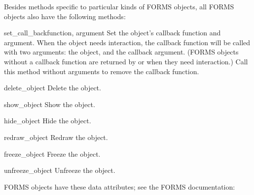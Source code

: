 Besides methods specific to particular kinds of FORMS objects, all
FORMS objects also have the following methods:

\begin{methoddesc}{set_call_back}{function, argument}
Set the object's callback function and argument.  When the object
needs interaction, the callback function will be called with two
arguments: the object, and the callback argument.  (FORMS objects
without a callback function are returned by 
or  when they need interaction.)  Call this
method without arguments to remove the callback function.
\end{methoddesc}

\begin{methoddesc}{delete_object}{}
  Delete the object.
\end{methoddesc}

\begin{methoddesc}{show_object}{}
  Show the object.
\end{methoddesc}

\begin{methoddesc}{hide_object}{}
  Hide the object.
\end{methoddesc}

\begin{methoddesc}{redraw_object}{}
  Redraw the object.
\end{methoddesc}

\begin{methoddesc}{freeze_object}{}
  Freeze the object.
\end{methoddesc}

\begin{methoddesc}{unfreeze_object}{}
  Unfreeze the object.
\end{methoddesc}



FORMS objects have these data attributes; see the FORMS documentation:

